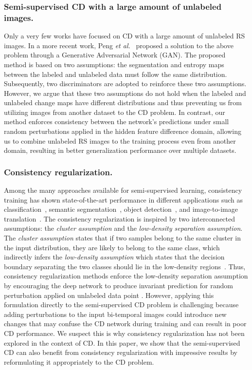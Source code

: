 \documentclass[runningheads]{llncs}
\begin{document}
\subsubsection{Semi-supervised CD with a large amount of unlabeled images.} \label{sec:sota_semi} Only a very few works have focused on CD with a large amount of unlabeled RS images. In a more recent work,  Peng \textit{et al.}~\cite{SemiCDNet} proposed a solution to the above problem through a Generative Adversarial Network (GAN). The proposed method is based on two assumptions: the segmentation and entropy maps between the labeled and unlabeled data must follow the same distribution. Subsequently, two discriminators are adopted to reinforce these two assumptions. However, we argue that these two assumptions do not hold when the labeled and unlabeled change maps have different distributions and thus preventing us from utilizing images from another dataset to the CD problem. In contrast, our method enforces consistency between the network's predictions under small random perturbations applied in the hidden feature difference domain, allowing us to combine unlabeled RS images to the training process even from another domain, resulting in better generalization performance over multiple datasets.
\vspace{-5mm}
\subsubsection{Consistency regularization.} Among the many approaches available for semi-supervised learning, consistency training has shown state-of-the-art performance in different applications such as classification~\cite{oliver2018realistic,sohn2020fixmatch,verma2019interpolation}, semantic segmentation~\cite{ouali2020semi,mittal2019semi,lai2021semi}, object detection~\cite{jeong2019consistency}, and image-to-image translation~\cite{Wang_2020_CVPR,mustafa2020transformation}. The consistency regularization is inspired by two interconnected assumptions: the \textit{cluster assumption} and the \textit{low-density separation assumption}. The \textit{cluster assumption} states that if two samples belong to the same cluster in the input distribution, they are likely to belong to the same class, which indirectly infers the \textit{low-density assumption} which states that  the decision boundary separating the two classes should lie in the low-density regions~\cite{chapelle2009semi}. Thus, consistency regularization methods enforce the low-density separation assumption by encouraging the deep network  to produce invariant prediction  for random perturbation  applied on unlabeled data point . However, applying this formulation directly to the semi-supervised CD problem is challenging because adding perturbations to the input bi-temporal images could introduce new changes that may confuse the CD network during training and can result in poor CD performance. We suspect this is why consistency regularization has not been explored in the context of CD. In this paper, we show that the semi-supervised CD can also benefit from consistency regularization with impressive results by reformulating it appropriately to the CD problem.
\vspace{-4mm}
\end{document}
